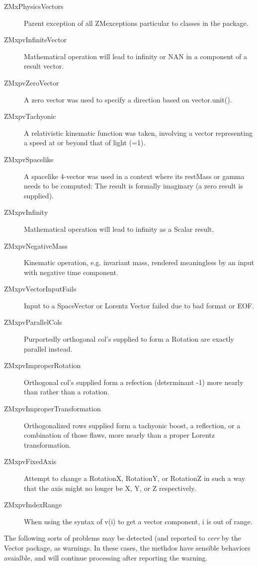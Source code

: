 \begin{description} 
\item [ZMxPhysicsVectors]
Parent exception of all ZMexceptions
particular to classes in the package.
\item [ZMxpvInfiniteVector]
Mathematical operation will lead
to infinity or NAN in a component
of a result vector.
\item [ZMxpvZeroVector]
A zero vector was used to specify
a direction based on vector.unit().
\item [ZMxpvTachyonic]
A relativistic kinematic function was
taken, involving a vector representing
a speed at or beyond that of light (=1).
\item [ZMxpvSpacelike]
A spacelike 4-vector was used in a
context where its restMass or gamma
needs to be computed:  The result is
formally imaginary (a zero result is
supplied).
\item [ZMxpvInfinity]
Mathematical operation will lead
to infinity as a Scalar result.
\item [ZMxpvNegativeMass]
Kinematic operation, e.g. invariant
mass, rendered meaningless by an input
with negative time component.
\item [ZMxpvVectorInputFails]
Input to a SpaceVector or Lorentz
Vector failed due to bad format or EOF.
\item [ZMxpvParallelCols]
Purportedly orthogonal col's supplied
to form a Rotation are exactly
parallel instead.
\item [ZMxpvImproperRotation]
 Orthogonal col's supplied form a
 refection (determinant -1) more
 nearly than rather than a rotation.
\item [ZMxpvImproperTransformation]
Orthogonalized rows supplied form a
tachyonic boost, a reflection, or
a combination of those flaws,
more nearly than a proper Lorentz
transformation.
\item [ZMxpvFixedAxis]
Attempt to change a RotationX,
RotationY, or RotationZ in such a way
that the axis might no longer be X,
Y, or Z respectively.
\item [ZMxpvIndexRange]
When using the syntax of v(i) to get
a vector component, i is out of range.
\end{description}


The following sorts of problems may be detected (and reported to {\em cerr}
by the Vector package, as warnings.  
In these cases, the methdos have sensible behaviors avaialble, and will continue
processing after reporting the warning.

